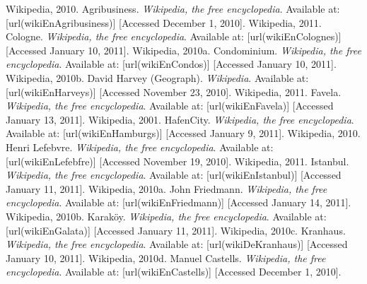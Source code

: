 {%
Wikipedia, 2010. Agribusiness. {\em Wikipedia, the free encyclopedia}. Available at:  [url(wikiEnAgribusiness)] [Accessed December 1, 2010]. \nl%
%
Wikipedia, 2011. Cologne. {\em Wikipedia, the free encyclopedia}. Available at:  [url(wikiEnColognes)] [Accessed January 10, 2011]. \nl%
%
Wikipedia, 2010a. Condominium. {\em Wikipedia, the free encyclopedia}. Available at:  [url(wikiEnCondos)] [Accessed January 10, 2011]. \nl%
%
Wikipedia, 2010b. David Harvey (Geograph). {\em Wikipedia}. Available at:  [url(wikiEnHarveys)] [Accessed November 23, 2010]. \nl%
%
Wikipedia, 2011. Favela. {\em Wikipedia, the free encyclopedia}. Available at:  [url(wikiEnFavela)] [Accessed January 13, 2011]. \nl%
%
Wikipedia, 2001. HafenCity. {\em Wikipedia, the free encyclopedia}. Available at:  [url(wikiEnHamburgs)] [Accessed January 9, 2011]. \nl%
%
Wikipedia, 2010. Henri Lefebvre. {\em Wikipedia, the free encyclopedia}. Available at:  [url(wikiEnLefebfre)] [Accessed November 19, 2010]. \nl%
%
Wikipedia, 2011. Istanbul. {\em Wikipedia, the free encyclopedia}. Available at:  [url(wikiEnIstanbul)] [Accessed January 11, 2011]. \nl%
%
Wikipedia, 2010a. John Friedmann. {\em Wikipedia, the free encyclopedia}. Available at:  [url(wikiEnFriedmann)] [Accessed January 14, 2011]. \nl%
%
Wikipedia, 2010b. Karaköy. {\em Wikipedia, the free encyclopedia}. Available at:  [url(wikiEnGalata)] [Accessed January 11, 2011]. \nl%
%
Wikipedia, 2010c. Kranhaus. {\em Wikipedia, the free encyclopedia}. Available at:  [url(wikiDeKranhaus)] [Accessed January 10, 2011]. \nl%
%
Wikipedia, 2010d. Manuel Castells. {\em Wikipedia, the free encyclopedia}. Available at:  [url(wikiEnCastells)] [Accessed December 1, 2010]. \nl%
}
